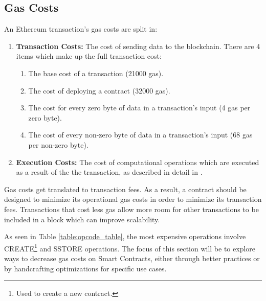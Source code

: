 \subsection{Gas Costs}
An Ethereum transaction's gas costs are split in: %
\begin{enumerate}
    \item \textbf{Transaction Costs:} The cost of sending data to the blockchain. There are 4 items which make up the full transaction cost:
        \begin{enumerate}
            \item The base cost of a transaction (21000 gas).
            \item The cost of deploying a contract (32000 gas).
            \item The cost for every zero byte of data in a transaction's input (4 gas per zero byte).
            \item The cost of every non-zero byte of data in a transaction's input (68 gas per non-zero byte).
        \end{enumerate}
    \item \textbf{Execution Costs:} The cost of computational operations which are executed as a result of the the transaction, as described in detail in \cite{ethereum, gas}.
\end{enumerate} 

Gas costs get translated to transaction fees. As a result, a contract should be designed to minimize its operational gas costs in order to minimize its transaction fees. Transactions that cost less gas allow more room for other transactions to be included in a block which can improve scalability. %




As seen in Table \ref{table:opcode_table}, the most expensive operations involve CREATE\footnote{Used to create a new contract.} and SSTORE operations. The focus of this section will be to explore ways to decrease gas costs on Smart Contracts, either through better practices or by handcrafting optimizations for specific use cases.

